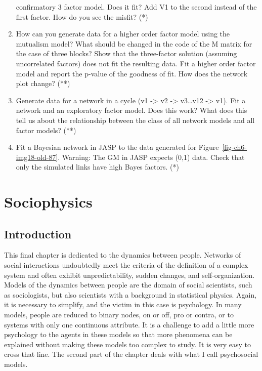 \documentclass[
  a4paper,
  DIV=11,
  numbers=noendperiod,
  oneside]{scrreprt}
\begin{document}
\begin{enumerate}
  confirmatory 3 factor model. Does it fit? Add V1 to the second instead
  of the first factor. How do you see the misfit? (*)
\item
  How can you generate data for a higher order factor model using the
  mutualism model? What should be changed in the code of the M matrix
  for the case of three blocks? Show that the three-factor solution
  (assuming uncorrelated factors) does not fit the resulting data. Fit a
  higher order factor model and report the p-value of the goodness of
  fit. How does the network plot change? (**)
\item
  Generate data for a network in a cycle (v1 -\textgreater{} v2
  -\textgreater{} v3\ldots v12 -\textgreater{} v1). Fit a network and an
  exploratory factor model. Does this work? What does this tell us about
  the relationship between the class of all network models and all
  factor models? (**)
\item
  Fit a Bayesian network in JASP to the data generated for
  Figure~\ref{fig-ch6-img18-old-87}. Warning: The GM in JASP expects
  (0,1) data. Check that only the simulated links have high Bayes
  factors. (*)
\end{enumerate}


\hypertarget{sec-ch7}{%
\chapter{Sociophysics}\label{sec-ch7}}

\hypertarget{sec-Introduction}{%
\section{Introduction}\label{sec-Introduction}}

This final chapter is dedicated to the dynamics between people. Networks
of social interactions undoubtedly meet the criteria of the definition
of a complex system and often exhibit unpredictability, sudden changes,
and self-organization. Models of the dynamics between people are the
domain of social scientists, such as sociologists, but also scientists
with a background in statistical physics. Again, it is necessary to
simplify, and the victim in this case is psychology. In many models,
people are reduced to binary nodes, on or off, pro or contra, or to
systems with only one continuous attribute. It is a challenge to add a
little more psychology to the agents in these models so that more
phenomena can be explained without making these models too complex to
study. It is very easy to cross that line. The second part of the
chapter deals with what I call psychosocial models.
\end{document}
